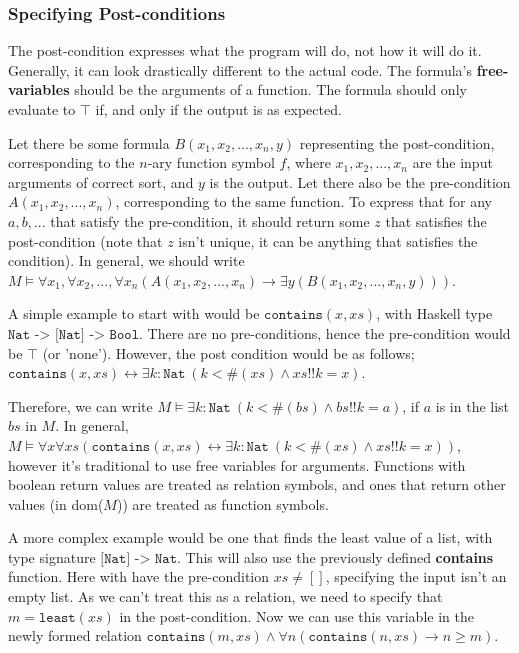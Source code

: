 \documentclass[a4paper, 12pt]{article}
\begin{document}
            \subsubsection*{Specifying Post-conditions}
                The post-condition expresses what the program will do, not how it will do it. Generally, it can look drastically different to the actual code. The formula's \textbf{free-variables} should be the arguments of a function. The formula should only evaluate to $\top$ if, and only if the output is as expected.
                \medskip

                Let there be some formula $B(x_1, x_2, ..., x_n, y)$ representing the post-condition, corresponding to the $n$-ary function symbol $f$, where $x_1, x_2, ..., x_n$ are the input arguments of correct sort, and $y$ is the output. Let there also be the pre-condition $A(x_1, x_2, ..., x_n)$, corresponding to the same function. To express that for any $a, b, ...$ that satisfy the pre-condition, it should return some $z$ that satisfies the post-condition (note that $z$ isn't unique, it can be anything that satisfies the condition). In general, we should write $M \vDash \forall x_1, \forall x_2, ..., \forall x_n (A(x_1, x_2, ..., x_n) \rightarrow \exists y (B(x_1, x_2, ..., x_n, y)))$.
                \medskip

                A simple example to start with would be $\texttt{contains}(x, xs)$, with Haskell type $\texttt{Nat -> [Nat] -> Bool}$. There are no pre-conditions, hence the pre-condition would be $\top$ (or 'none'). However, the post condition would be as follows; $\texttt{contains}(x, xs) \leftrightarrow \exists k : \texttt{Nat}\ (k < \#(xs) \land xs !! k = x)$.
                \smallskip

                Therefore, we can write $M \vDash \exists k : \texttt{Nat}\ (k < \#(bs) \land bs !! k = a)$, if $a$ is in the list $bs$ in $M$. In general, $M \vDash \forall x \forall xs (\texttt{contains}(x, xs) \leftrightarrow \exists k : \texttt{Nat}\ (k < \#(xs) \land xs !! k = x))$, however it's traditional to use free variables for arguments. Functions with boolean return values are treated as relation symbols, and ones that return other values (in dom($M$)) are treated as function symbols.
                \medskip

                A more complex example would be one that finds the least value of a list, with type signature $\texttt{[Nat] -> Nat}$. This will also use the previously defined \textbf{contains} function. Here with have the pre-condition $xs \neq []$, specifying the input isn't an empty list. As we can't treat this as a relation, we need to specify that $m = \texttt{least}(xs)$ in the post-condition. Now we can use this variable in the newly formed relation $\texttt{contains}(m, xs) \land \forall n (\texttt{contains}(n, xs) \rightarrow n \geq m)$.
                \medskip
\end{document}
